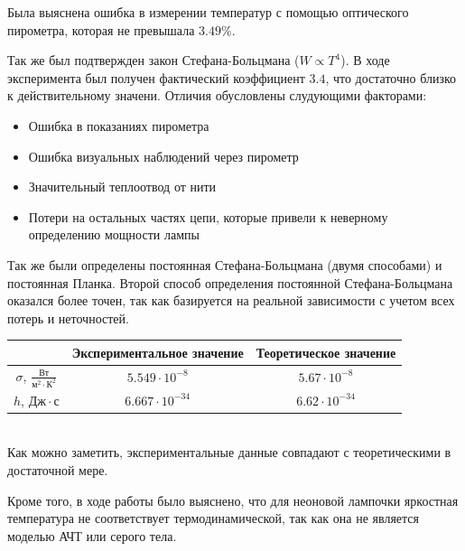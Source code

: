 \documentclass[12pt]{article}
\begin{document}
    Была выяснена ошибка в измерении температур с помощью оптического пирометра,
    которая не превышала $3.49 \%$.

    Так же был подтвержден закон Стефана-Больцмана ($W \propto T^4$). В ходе
    эксперимента был получен фактический коэффициент $3.4$, что достаточно
    близко к действительному значени. Отличия обусловлены слудующими факторами:

    \begin{itemize}
      \item Ошибка в показаниях пирометра
      \item Ошибка визуальных наблюдений через пирометр
      \item Значительный теплоотвод от нити
      \item Потери на остальных частях цепи, которые привели к неверному
      определению мощности лампы
    \end{itemize}

    Так же были определены постоянная Стефана-Больцмана (двумя способами) и
    постоянная Планка. Второй способ определения постоянной Стефана-Больцмана
    оказался более точен, так как базируется на реальной зависимости с учетом
    всех потерь и неточностей.\\

    \begin{tabular}{ || c || c | c | }
      \hline
       & Экспериментальное значение & Теоретическое значение \\ \hline\hline
       $\sigma$, $\frac{Вт}{м^2 \cdot К^2}$ & $5.549 \cdot 10^{-8}$ & $5.67 \cdot 10^{-8}$ \\ \hline
       $h$, $Дж \cdot с$ & $6.667 \cdot 10^{-34}$ & $6.62 \cdot 10^{-34}$ \\ \hline
    \end{tabular}\\

    Как можно заметить, экспериментальные данные совпадают с теоретическими в
    достаточной мере.

    Кроме того, в ходе работы было выяснено, что для неоновой лампочки яркостная
    температура не соответствует термодинамической, так как она не является
    моделью АЧТ или серого тела.
\end{document}

